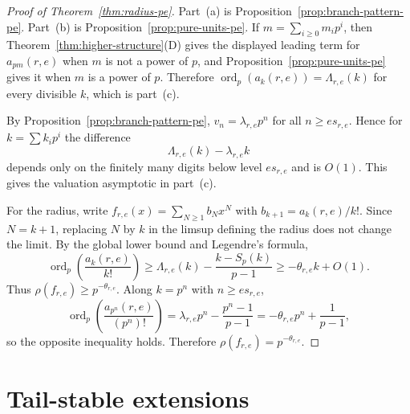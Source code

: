 \documentclass[11pt]{amsart}
\numberwithin{equation}{section}
\DeclareMathOperator{\ordop}{ord}
\newcommand{\Sp}{S_p}
\newcommand{\bigo}{O}
\newcommand{\vp}{\ordop_p}
\begin{document}
\begin{proof}[Proof of Theorem~\ref{thm:radius-pe}]
Part~\textup{(a)} is Proposition~\ref{prop:branch-pattern-pe}.  Part~\textup{(b)} is Proposition~\ref{prop:pure-units-pe}.  If $m=\sum_{i\ge0}m_ip^i$, then Theorem~\ref{thm:higher-structure}(D) gives the displayed leading term for $a_{pm}(r,e)$ when $m$ is not a power of $p$, and Proposition~\ref{prop:pure-units-pe} gives it when $m$ is a power of $p$.  Therefore $\vp(a_k(r,e))=\Lambda_{r,e}(k)$ for every divisible $k$, which is part~\textup{(c)}.

By Proposition~\ref{prop:branch-pattern-pe}, $v_n=\lambda_{r,e}p^n$ for all $n\ge es_{r,e}$.  Hence for $k=\sum k_ip^i$ the difference
\[
        \Lambda_{r,e}(k)-\lambda_{r,e}k
\]
depends only on the finitely many digits below level $es_{r,e}$ and is $\bigo(1)$.  This gives the valuation asymptotic in part~\textup{(c)}.

For the radius, write $f_{r,e}(x)=\sum_{N\ge1}b_Nx^N$ with $b_{k+1}=a_k(r,e)/k!$.  Since $N=k+1$, replacing $N$ by $k$ in the limsup defining the radius does not change the limit.  By the global lower bound and Legendre's formula,
\[
        \vp\left(\frac{a_k(r,e)}{k!}\right)
        \ge \Lambda_{r,e}(k)-\frac{k-\Sp(k)}{p-1}
        \ge -\theta_{r,e}k+\bigo(1).
\]
Thus $\rho(f_{r,e})\ge p^{-\theta_{r,e}}$.  Along $k=p^n$ with $n\ge es_{r,e}$,
\[
        \vp\left(\frac{a_{p^n}(r,e)}{(p^n)!}\right)
        =\lambda_{r,e}p^n-\frac{p^n-1}{p-1}
        =-\theta_{r,e}p^n+\frac1{p-1},
\]
so the opposite inequality holds.  Therefore $\rho(f_{r,e})=p^{-\theta_{r,e}}$.
\end{proof}


\section{Tail-stable extensions}\label{sec:tail-stability}
\end{document}
